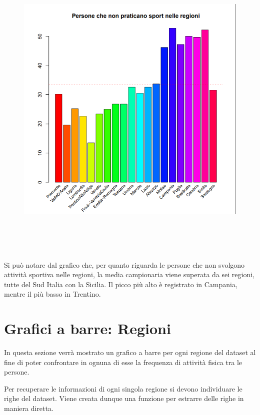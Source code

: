 \begin{figure}[!htbp]
    \centering
    \includegraphics[height=15cm]{ProgettoSAD/capitoli/images/barre_nonpratsport.png}
    \label{fig:barre_nonpratsport}
\end{figure}

Si può notare dal grafico che, per quanto riguarda le persone che non svolgono attività sportiva nelle regioni, la media campionaria viene superata da sei regioni, tutte del Sud Italia con la Sicilia. Il picco più alto è registrato in Campania, mentre il più basso in Trentino.

\section{Grafici a barre: Regioni}\label{cap2.2}

In questa sezione verrà mostrato un grafico a barre per ogni regione del dataset al fine di poter confrontare in ognuna di esse la frequenza di attività fisica tra le persone.

Per recuperare le informazioni di ogni singola regione si devono individuare le righe del dataset. Viene creata dunque una funzione per estrarre delle righe in maniera diretta.

